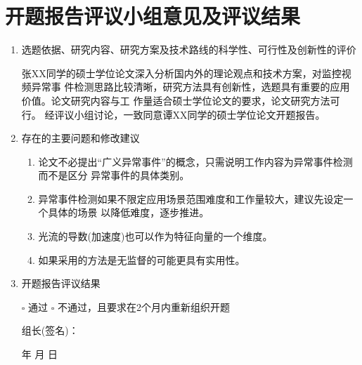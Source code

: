 \section{开题报告评议小组意见及评议结果}\label{sec:groupComments}
\begin{mdframed}[everyline=true]

\begin{enumerate}[label={(\arabic*)},labelsep= 3 pt]
	\item {\songti 选题依据、研究内容、研究方案及技术路线的科学性、可行性及创新性的评价}
	
	\quad\quad  张XX同学的硕士学位论文深入分析国内外的理论观点和技术方案，对监控视频异常事 件检测思路比较清晰，研究方法具有创新性，选题具有重要的应用价值。论文研究内容与工 作量适合硕士学位论文的要求，论文研究方法可行。
	经评议小组讨论，一致同意谭XX同学的硕士学位论文开题报告。
	
	\item  {\songti 存在的主要问题和修改建议 }
	\begin{enumerate}[label={\arabic*)},labelsep=3 pt]
		\item 论文不必提出“广义异常事件”的概念，只需说明工作内容为异常事件检测而不是区分 异常事件的具体类别。
		\item 异常事件检测如果不限定应用场景范围难度和工作量较大，建议先设定一个具体的场景 以降低难度，逐步推进。
		\item 光流的导数(加速度)也可以作为特征向量的一个维度。
		\item 如果采用的方法是无监督的可能更具有实用性。
	\end{enumerate}

	\item  {\songti 开题报告评议结果}
	
    $\square$  {\songti 通过} \quad\quad \quad \quad  $\square$ {\songti 不通过，且要求在2个月内重新组织开题}
	\\[20pt]
	
	
	{  \songti
	\quad\quad\quad\quad \quad\quad\quad\quad 	\quad\quad\quad\quad \quad\quad\quad\quad 组长(签名)：
	
	\quad\quad\quad\quad \quad\quad\quad\quad 	\quad\quad\quad\quad \quad\quad\quad\quad \quad\quad\quad 年  \quad\quad 月  \quad\quad 日
	\\
    }
\end{enumerate}
\end{mdframed}
\vspace{-4pt}
